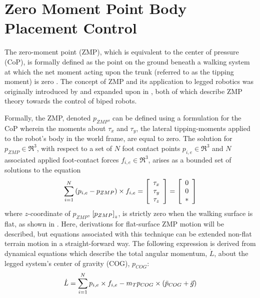 	\section{Zero Moment Point Body Placement Control}

		The zero-moment point (ZMP), which is equivalent to the center of pressure (CoP), is formally defined as the point on the ground beneath a walking system at which the net moment acting upon the trunk (referred to as the tipping moment) is zero \cite{Sardain2004}. The concept of ZMP and its application to legged robotics was originally introduced by \cite{Vuko1972} and expanded upon in \cite{Goswami1999}, both of which describe ZMP theory towards the control of biped robots.

		Formally, the ZMP, denoted $p_{ZMP}$, can be defined using a formulation for the CoP wherein the moments about $\tau_{x}$ and $\tau_{y}$, the lateral tipping-moments applied to the robot's body in the world frame, are equal to zero. The solution for $p_{ZMP}\in\Re^{3}$, with respect to a set of $N$ foot contact points $p_{i,e}\in\Re^{3}$ and $N$ associated applied foot-contact forces $f_{i,e}\in\Re^{3}$, arises as a bounded set of solutions to the equation
			\begin{equation}
				\sum^{N}_{i=1}\left(p_{i,e}-p_{ZMP}\right)\times f_{i,e} 
				= 
				\left[
					\begin{array}{c}
						\tau_{x}	\\
						\tau_{y}	\\
						\tau_{z}
					\end{array}
				\right]
				=
				\left[
					\begin{array}{c}
						0			\\
						0			\\
						*
					\end{array}
				\right]
			\end{equation}
		where $z$-coordinate of $p_{ZMP}$, $\left[p_{ZMP}\right]_{z}$, is strictly zero when the walking surface is flat, as shown in \cite{Wieber2015}. Here, derivations for flat-surface ZMP motion will be described, but equations associated with this technique can be extended non-flat terrain motion in a straight-forward way. The following expression is derived from dynamical equations which describe the total angular momentum, $\dot{L}$, about the legged system's center of gravity (COG), $p_{COG}$:
			\begin{equation}
				\dot{L} = \sum_{i=1}^{N} p_{i,e}\times f_{i,e} - m_{T} p_{COG} \times \left( \ddot{p}_{COG} + \vec{g} \right)
			\end{equation}
